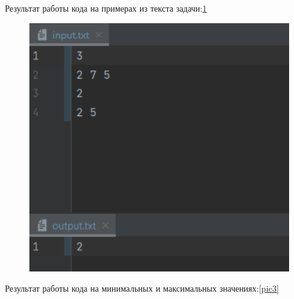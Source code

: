 \newpage
Результат работы кода на примерах из текста задачи:\ref{pic4}
\begin{figure}[H]
    \label{pic4}
	\begin{center}
		\includegraphics[scale=0.7]{fig/4_text.png}
	\end{center}
\end{figure}
\newline
Результат работы кода на минимальных и максимальных значениях:\ref{pic3}
